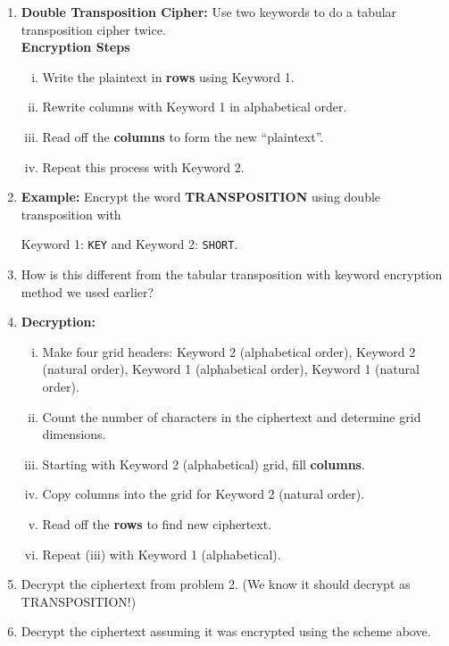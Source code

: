 \documentclass[12pt]{article}
\renewcommand{\emph}[1]{\textsf{\textbf{#1}}}
\newcommand{\be}{\begin{enumerate}}
\newcommand{\ee}{\end{enumerate}}
\begin{document}
\begin{enumerate}
\item \emph{Double Transposition Cipher:} Use two keywords to do a tabular transposition cipher twice.\\

\emph{Encryption Steps}

\be[i.]
\item Write the plaintext in \textbf{rows} using Keyword 1.
\item Rewrite columns with Keyword 1 in alphabetical order.
\item Read off the \emph{columns} to form the new ``plaintext''. 
\item Repeat this process with Keyword 2.\\
\ee


\item \emph{Example:} Encrypt the word \textbf{TRANSPOSITION} using double transposition with \begin{center} Keyword 1: {\tt KEY} and Keyword 2: {\tt SHORT}. \end{center}

\vfill

\item How is this different from the tabular transposition with keyword encryption method we used earlier?\\

\vspace{.5in}

\newpage


\item \emph{Decryption:}

\be[i.]
\item Make four grid headers: Keyword 2 (alphabetical order), Keyword 2 (natural order), Keyword 1 (alphabetical order), Keyword 1 (natural order).
\item Count the number of characters in the ciphertext and determine grid dimensions.
\item Starting with Keyword 2 (alphabetical) grid, fill  \emph{columns}.
\item Copy columns into the grid for Keyword 2 (natural order).
\item Read off the {\bf rows} to find new ciphertext.
\item Repeat (iii) with Keyword 1 (alphabetical).
\ee


\item {Decrypt} the ciphertext from problem 2. (We know it should decrypt as TRANSPOSITION!)


\vfill


\item {Decrypt} the ciphertext  assuming it was encrypted using the scheme above.

\vfill



\end{enumerate}
\end{document}
